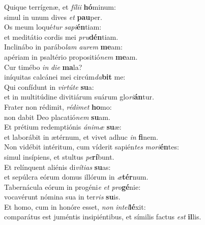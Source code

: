 \evenverse Quique terrígenæ, et \textit{fí}\textit{li}\textit{i} \textbf{hó}minum:~\*\\
\evenverse simul in unum dives \textit{et} \textbf{pau}per.\\
\oddverse Os meum loqué\textit{tur} \textit{sa}\textit{pi}\textbf{én}tiam:~\*\\
\oddverse et meditátio cordis mei \textit{pru}\textbf{dén}tiam.\\
\evenverse Inclinábo in parábo\textit{lam} \textit{au}\textit{rem} \textbf{me}am:~\*\\
\evenverse apériam in psaltério propositió\textit{nem} \textbf{me}am.\\
\oddverse Cur timébo \textit{in} \textit{di}\textit{e} \textbf{ma}la?~\*\\
\oddverse iníquitas calcánei mei circúm\textit{da}\textbf{bit} me:\\
\evenverse Qui confídunt in \textit{vir}\textit{tú}\textit{te} \textbf{su}a:~\*\\
\evenverse et in multitúdine divitiárum suárum glo\textit{ri}\textbf{án}tur.\\
\oddverse Frater non rédimit, \textit{ré}\textit{di}\textit{met} \textbf{ho}mo:~\*\\
\oddverse non dabit Deo placatió\textit{nem} \textbf{su}am.\\
\evenverse Et prétium redemptiónis \textit{á}\textit{ni}\textit{mæ} \textbf{su}æ:~\*\\
\evenverse et laborábit in ætérnum, et vivet adhuc \textit{in} \textbf{fi}nem.\\
\oddverse Non vidébit intéritum, cum víderit sapién\textit{tes} \textit{mo}\textit{ri}\textbf{én}tes:~\*\\
\oddverse simul insípiens, et stultus \textit{pe}\textbf{rí}bunt.\\
\evenverse Et relínquent aliénis di\textit{ví}\textit{ti}\textit{as} \textbf{su}as:~\*\\
\evenverse et sepúlcra eórum domus illórum in \textit{æ}\textbf{tér}num.\\
\oddverse Tabernácula eórum in progéni\textit{e} \textit{et} \textit{pro}\textbf{gé}nie:~\*\\
\oddverse vocavérunt nómina sua in ter\textit{ris} \textbf{su}is.\\
\evenverse Et homo, cum in honóre esset, \textit{non} \textit{in}\textit{tel}\textbf{lé}xit:~\*\\
\evenverse comparátus est juméntis insipiéntibus, et símilis factus \textit{est} \textbf{il}lis.\\

